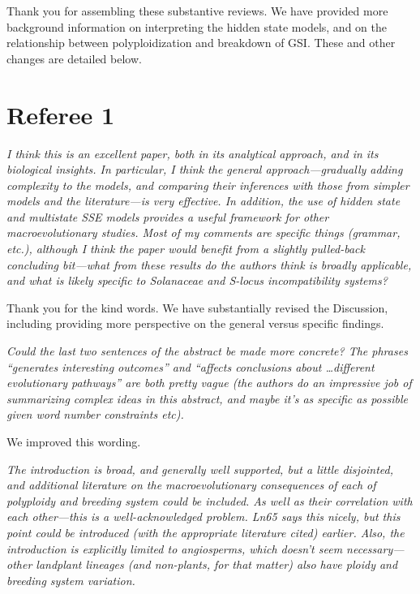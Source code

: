 \documentclass[11pt]{article}
\renewenvironment{quote}{\bigskip\noindent\itshape\ignorespaces}{\smallskip}
\begin{document}
Thank you for assembling these substantive reviews.
We have provided more background information on interpreting the hidden state models, and on the relationship between polyploidization and breakdown of GSI.
These and other changes are detailed below.

\section{Referee 1}
\vspace{-11pt}


\begin{quote}
I think this is an excellent paper, both in its analytical approach, and in its biological insights.
In particular, I think the general approach---gradually adding complexity to the models, and comparing their inferences with those from simpler models and the literature---is very effective.
In addition, the use of hidden state and multistate SSE models provides a useful framework for other macroevolutionary studies. 
Most of my comments are specific things (grammar, etc.), although I think the paper would benefit from a slightly pulled-back concluding bit---what from these results do the authors think is broadly applicable, and what is likely specific to Solanaceae and S-locus incompatibility systems?
\end{quote}

Thank you for the kind words.
We have substantially revised the Discussion, including providing more perspective on the general versus specific findings. %


\begin{quote}
Could the last two sentences of the abstract be made more concrete?
The phrases ``generates interesting outcomes'' and ``affects conclusions about \ldots different evolutionary pathways'' are both pretty vague (the authors do an impressive job of summarizing complex ideas in this abstract, and maybe it's as specific as possible given word number constraints etc).
\end{quote}

We improved this wording.


\begin{quote}
The introduction is broad, and generally well supported, but a little disjointed, and additional literature on the macroevolutionary consequences of each of polyploidy and breeding system could be included.
As well as their correlation with each other---this is a well-acknowledged problem.
Ln65 says this nicely, but this point could be introduced (with the appropriate literature cited) earlier.
Also, the introduction is explicitly limited to angiosperms, which doesn't seem necessary---other landplant lineages (and non-plants, for that matter) also have ploidy and breeding system variation.
\end{quote}
\end{document}
